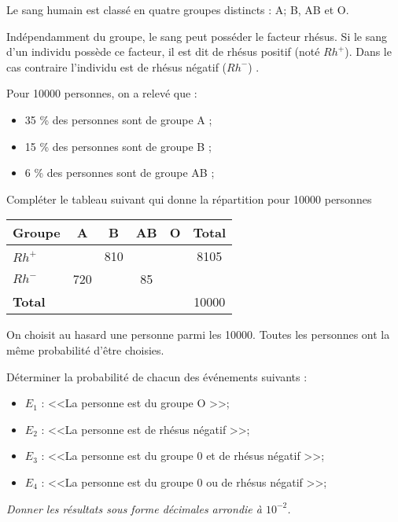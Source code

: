 
Le sang humain est classé en quatre groupes distincts : A; B, AB et O.

Indépendamment du groupe, le sang peut posséder le facteur rhésus. Si le sang d'un individu possède ce facteur, il est dit de rhésus positif (noté $Rh^+$). Dans le cas contraire l'individu est de rhésus négatif ($Rh^-$) .

Pour \num{10000} personnes, on a relevé que :

\begin{itemize}
	\item 35 \% des personnes sont de groupe A ;
	\item 15 \% des personnes sont de groupe B ;
	\item 6 \% des personnes sont de groupe AB ;
\end{itemize}

\begin{questions}
	
	\question[5] Compléter le tableau suivant qui donne la répartition pour \num{10000} personnes
	
	\begin{center}
		\begin{tabular}{|@{\ }l@{\ }|c|c|c|c|@{\ }@{\ }c@{\ }@{\ }|}
			\hline
			\textbf{Groupe} & \textbf{A}   & \textbf{B}   & \textbf{AB} & \textbf{O}        & \textbf{Total}       \\ \hline
			\textbf{$Rh^+$} &     & 810 &    &  & \num{8105}  \\ \hline
			\textbf{$Rh^-$} & 720 &     & 85 &          &             \\ \hline
			\textbf{Total}  &     &     &    &          & \num{10000} \\ \hline
		\end{tabular}
		
	\end{center}
	
	
	\question[5]
	
	On choisit au hasard une personne parmi les \num{10000}. Toutes les personnes ont la même probabilité d'être choisies.
	
	Déterminer la probabilité de chacun des événements suivants :
	
	\begin{itemize}
		\item $E_1$ : <<La personne est du groupe O >>;
		\item $E_2$ : <<La personne est de rhésus négatif >>;
		\item $E_3$ : <<La personne est du groupe 0 et de rhésus négatif >>;
		\item $E_4$ : <<La personne est du groupe 0 ou de rhésus négatif >>;
	\end{itemize}
	\textit{Donner les résultats sous forme décimales arrondie à $10^{-2}$. }
	
	
	\fillwithdottedlines{9cm}
\end{questions}